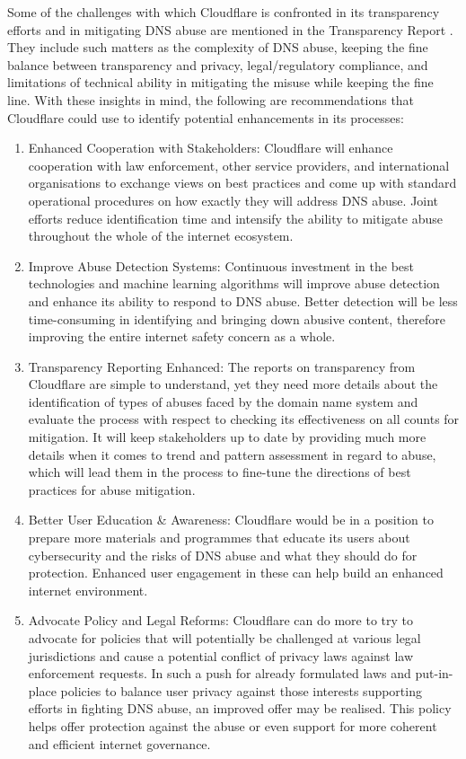 \begin{enumerate}
\begin{enumerate}
\end{enumerate}

Some of the challenges with which Cloudflare is confronted in its transparency efforts and in mitigating DNS abuse are mentioned in the Transparency Report . They include such matters as the complexity of DNS abuse, keeping the fine balance between transparency and privacy, legal/regulatory compliance, and limitations of technical ability in mitigating the misuse while keeping the fine line. With these insights in mind, the following are recommendations that Cloudflare could use to identify potential enhancements in its processes:

\begin{enumerate}
    \item Enhanced Cooperation with Stakeholders: Cloudflare will enhance cooperation with law enforcement, other service providers, and international organisations to exchange views on best practices and come up with standard operational procedures on how exactly they will address DNS abuse. Joint efforts reduce identification time and intensify the ability to mitigate abuse throughout the whole of the internet ecosystem.
    \item Improve Abuse Detection Systems: Continuous investment in the best technologies and machine learning algorithms will improve abuse detection and enhance its ability to respond to DNS abuse. Better detection will be less time-consuming in identifying and bringing down abusive content, therefore improving the entire internet safety concern as a whole.
    \item Transparency Reporting Enhanced: The reports on transparency from Cloudflare are simple to understand, yet they need more details about the identification of types of abuses faced by the domain name system and evaluate the process with respect to checking its effectiveness on all counts for mitigation. It will keep stakeholders up to date by providing much more details when it comes to trend and pattern assessment in regard to abuse, which will lead them in the process to fine-tune the directions of best practices for abuse mitigation.
    \item Better User Education \& Awareness: Cloudflare would be in a position to prepare more materials and programmes that educate its users about cybersecurity and the risks of DNS abuse and what they should do for protection. Enhanced user engagement in these can help build an enhanced internet environment.
    \item Advocate Policy and Legal Reforms: Cloudflare can do more to try to advocate for policies that will potentially be challenged at various legal jurisdictions and cause a potential conflict of privacy laws against law enforcement requests. In such a push for already formulated laws and put-in-place policies to balance user privacy against those interests supporting efforts in fighting DNS abuse, an improved offer may be realised. This policy helps offer protection against the abuse or even support for more coherent and efficient internet governance.

\end{enumerate}
\end{enumerate}
